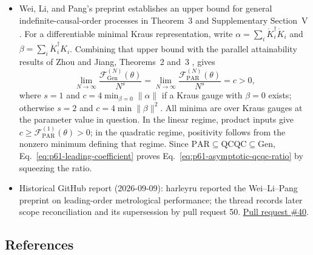 \begin{itemize}
  \item Wei, Li, and Pang's preprint establishes an upper bound for general
  indefinite-causal-order processes in Theorem~3 and Supplementary
  Section~V . For a differentiable minimal
  Kraus representation, write $\alpha=\sum_i\dot K_i^\dagger\dot K_i$ and
  $\beta=\sum_i\dot K_i^\dagger K_i$. Combining that upper bound with the
  parallel attainability results of Zhou and Jiang, Theorems~2 and~3
  , gives
  \begin{equation}
    \lim_{N\to\infty}\frac{\mathcal F_{\mathrm{Gen}}^{(N)}(\theta)}{N^s}
    =\lim_{N\to\infty}\frac{\mathcal F_{\mathrm{PAR}}^{(N)}(\theta)}{N^s}
    =c>0,
    \label{eq:p61-leading-coefficient}
  \end{equation}
  where $s=1$ and $c=4\min_{\beta=0}\lVert\alpha\rVert$ if a Kraus gauge
  with $\beta=0$ exists; otherwise $s=2$ and
  $c=4\min\lVert\beta\rVert^2$. All minima are over Kraus gauges at the
  parameter value in question. In the linear regime, product inputs give
  $c\ge\mathcal F_{\mathrm{PAR}}^{(1)}(\theta)>0$; in the quadratic regime,
  positivity follows from the nonzero minimum defining that regime.
  Since $\mathrm{PAR}\subseteq\mathrm{QCQC}\subseteq\mathrm{Gen}$,
  Eq.~\eqref{eq:p61-leading-coefficient} proves
  Eq.~\eqref{eq:p61-asymptotic-qcqc-ratio} by squeezing the ratio.

  \item Historical GitHub report (2026-09-09): harleyru reported the Wei--Li--Pang preprint on leading-order metrological performance; the thread records later scope reconciliation and its supersession by pull request 50. \href{https://github.com/Naixu-Guo/quantum-open-problems/pull/40}{Pull request \#40}.
\end{itemize}

\subsection*{References}

